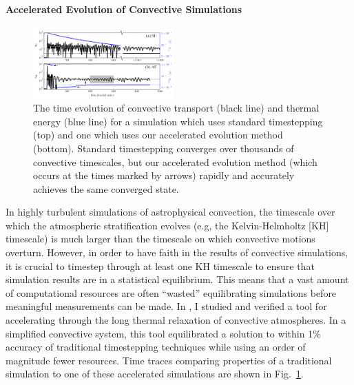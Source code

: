 \documentclass[preprint, hmargin=1in, vmargin=1in]{aastex62}
\begin{document}
\paragraph{Accelerated Evolution of Convective Simulations}
\begin{figure}
	\begin{center}
	\vspace{-22pt}
    \includegraphics[width=0.48\textwidth]{./figs/nu_v_time.png}
	\vspace{-16pt}
	\end{center}
    \caption{
	\citep[Fig.~2 of][]{anders&all2018} The time evolution of convective transport (black line) and thermal energy (blue line) for a simulation which uses standard timestepping (top) and one which uses our accelerated evolution method (bottom).
	Standard timestepping converges over thousands of convective timescales, but our accelerated evolution method (which occurs at the times marked by arrows) rapidly and accurately achieves the same converged state.
	\label{fig:ae_plot} }
	\vspace{-16pt}
\end{figure}
In highly turbulent simulations of astrophysical convection, the timescale over which the atmospheric stratification evolves (e.g, the Kelvin-Helmholtz [KH] timescale) is much larger than the timescale on which convective motions overturn.
However, in order to have faith in the results of convective simulations, it is crucial to timestep through at least one KH timescale to ensure that simulation results are in a statistical equilibrium.
This means that a vast amount of computational resources are often ``wasted'' equilibrating simulations before meaningful measurements can be made.
In \citet{anders&all2018}, I studied and verified a tool for accelerating through the long thermal relaxation of convective atmospheres.
In a simplified convective system, this tool equilibrated a solution to within 1\% accuracy of traditional timestepping techniques while using an order of magnitude fewer resources.
Time traces comparing properties of a traditional simulation to one of these accelerated simulations are shown in Fig.~\ref{fig:ae_plot}.
\end{document}
